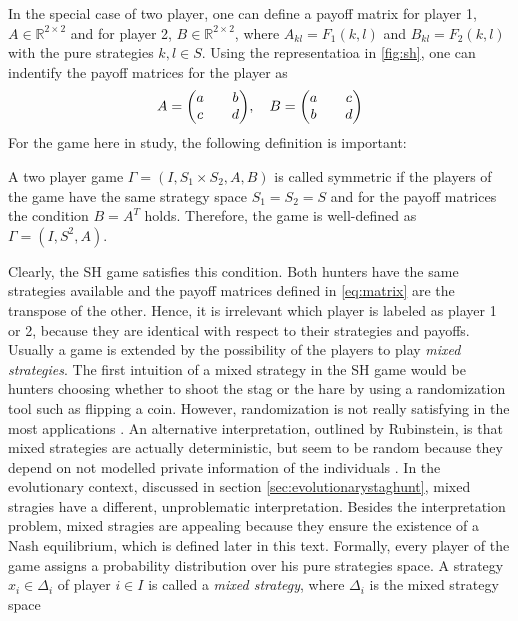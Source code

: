 \documentclass[11pt]{article}
\newcommand{\realnumb}{\mathbb{R}}
\begin{document}
In the special case of two player, one 
can define a payoff matrix for player 1, $A \in \realnumb^{2 \times2}$ and for 
player 2,  $B \in \realnumb^{2 \times2}$, where $A_{kl} = F_1(k,l)$ and $
B_{kl} = F_2(k,l)$ with the pure strategies $k,l \in S$. Using the 
representatioa in \ref{fig:sh}, one can indentify the payoff matrices for 
the player as
\begin{align}
     A = \mqty(a && b \\ c && d), \quad B = \mqty(a && c \\ b && d)
        \label{eq:matrix}
\end{align}
For the game here in study, the following definition is important: 
\begin{mydef}
        A two player game $\Gamma=(I,S_1 \times S_2, A,B)$ is called symmetric
        if the players of the game have the same strategy space $S_1=S_2=S$ and
        for the payoff matrices the condition $B=A^T$ holds. Therefore, the
        game is well-defined as $\Gamma=(I,S^2,A)$.
        \label{symmetry}
\end{mydef}
Clearly, the SH game satisfies this condition. Both hunters have the same 
strategies available and the payoff matrices defined in 
\eqref{eq:matrix}  are the transpose of the other.
Hence, it is irrelevant which player is labeled as player 1 or 2, because 
they are identical with respect to their strategies and payoffs.
Usually a game is extended by the possibility of the players to play
\textit{mixed strategies}. 
The first intuition of a mixed strategy in the SH game would be hunters
choosing whether to shoot the stag or the hare by using a randomization
tool such as flipping a coin. However, randomization is not really
satisfying in the most applications \parencite{radner_private_1982}. An
alternative interpretation, outlined by Rubinstein, is that mixed 
strategies are actually deterministic, but seem to be random because they 
depend on not modelled private information of the individuals 
\parencite[914]{rubinstein_comments_1991}. In the evolutionary context,
discussed in section \ref{sec:evolutionarystaghunt}, mixed stragies have
a different, unproblematic interpretation. Besides the interpretation problem,
mixed stragies are appealing because they ensure the existence
of a Nash equilibrium, which is defined later in this text.
Formally, every player of the game assigns a probability distribution over
his pure strategies space. A strategy $x_i \in \Delta_i$ of 
player $i \in I$ is called a \textit{mixed strategy}, where $\Delta_i$ is 
the mixed strategy space 
\end{document}
